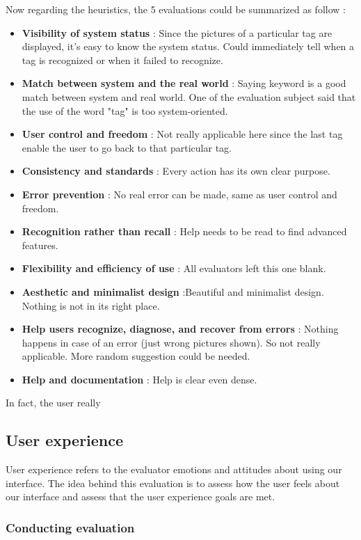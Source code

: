 \documentclass[11pt,a4paper]{article}
\begin{document}
Now regarding the heuristics, the 5 evaluations could be summarized as follow :
\begin{itemize}
	\item \textbf{Visibility of system status} : Since the pictures of a particular tag are displayed, it's easy to know the system status. Could immediately tell when a tag is recognized or when it failed to recognize.
	\item \textbf{Match between system and the real world} : Saying keyword is a good match between system and real world. One of the evaluation subject said that the use of the word "tag" is too system-oriented. 
	\item \textbf{User control and freedom} : Not really applicable here since the last tag enable the user to go back to that particular tag.
	\item \textbf{Consistency and standards} : Every action has its own clear purpose. 
	\item \textbf{Error prevention} : No real error can be made, same as user control and freedom.
	\item \textbf{Recognition rather than recall} : Help needs to be read to find advanced features.
	\item \textbf{Flexibility and efficiency of use} : All evaluators left this one blank.
	\item \textbf{Aesthetic and minimalist design} :Beautiful and minimalist design. Nothing is not in its right place.
	\item \textbf{Help users recognize, diagnose, and recover from errors} : Nothing happens in case of an error (just wrong pictures shown). So not really applicable. More random suggestion could be needed.
	\item \textbf{Help and documentation} : Help is clear even dense.
\end{itemize}



In fact, the user really


\subsection{User experience}

User experience refers to the evaluator emotions and attitudes about using our interface. The idea behind this evaluation is to assess how the user feels about our interface and assess that the user experience goals are met.


\subsubsection{Conducting evaluation}
\end{document}
